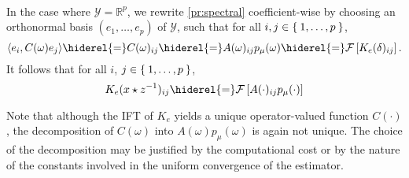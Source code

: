 \paragraph{}
In the case where $\mathcal{Y}=\mathbb{R}^p$, we rewrite \cref{pr:spectral} coefficient-wise by choosing an orthonormal basis $(e_1,\ldots, e_p)$ of $\mathcal{Y}$, such that for all $ i,j\in \Set{1, \ldots, p}$,
\begin{dmath}
\label{eq:operator_identification_real}\inner{e_i,C(\omega)e_j}\hiderel{=}C(\omega)_{ij}\hiderel{=}A(\omega)_{ij}p_{\mu}(\omega)\hiderel{=}\FT{K_e(\delta)_{ij}}.
\end{dmath}
It follows that for all $i$, $j \in \Set{1, \ldots, p}$,
\begin{dmath}\label{eq:matrix-exp}
K_e(x\groupop \inv{z})_{ij} \hiderel{=} \FT{A(\cdot)_{ij}p_\mu(\cdot)}
\end{dmath}

\begin{remark}
Note that although the \acl{IFT} of $K_e$ yields a unique operator-valued function $C(\cdot)$, the decomposition of $C(\omega)$ into $A(\omega)p_\mu(\omega)$ is again not unique. The choice of the decomposition may be justified by the computational cost or by the nature of the constants involved in the uniform convergence of the estimator.
\end{remark}

